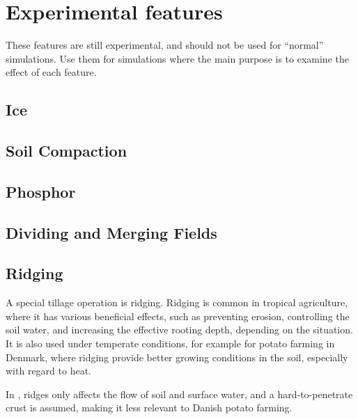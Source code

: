 \documentclass[a4paper,11pt]{article}
\begin{document}
\appendix

\section{Experimental features}
\label{sec:exp}

These features are still experimental, and should not be used for
``normal'' simulations.  Use them for simulations where the main
purpose is to examine the effect of each feature.

\subsection{Ice}
\label{sec:ice}


\subsection{Soil Compaction}
\label{sec:compact}


\subsection{Phosphor}
\label{sec:phosphor}


\subsection{Dividing and Merging Fields}
\label{sec:divide}


\subsection{Ridging}

A special tillage operation is ridging.  Ridging is common in tropical
agriculture, where it has various beneficial effects, such as
preventing erosion, controlling the soil water, and increasing the
effective rooting depth, depending on the situation.  It is also used
under temperate conditions, for example for potato farming in Denmark,
where ridging provide better growing conditions in the soil,
especially with regard to heat.

In \daisy{}, ridges only affects the flow of soil and surface water,
and a hard-to-penetrate crust is assumed, making it less relevant to
Danish potato farming.
\end{document}
